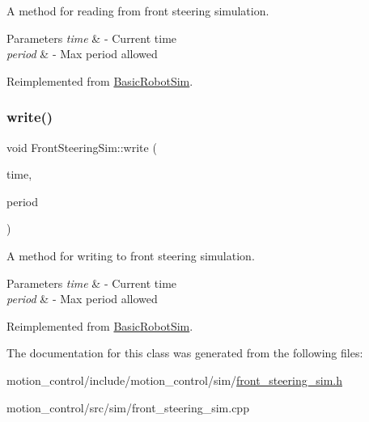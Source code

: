 A method for reading from front steering simulation. 


\begin{DoxyParams}{Parameters}
{\em time} & -\/ Current time \\
\hline
{\em period} & -\/ Max period allowed \\
\hline
\end{DoxyParams}


Reimplemented from \hyperlink{classBasicRobotSim_a8e6a778a8f79818f01dcf0211a3b8e3f}{Basic\+Robot\+Sim}.

\mbox{\label{classFrontSteeringSim_afbf1c3df92319f90d5019729e9067585}} 
\subsubsection{\texorpdfstring{write()}{write()}}
{\footnotesize\ttfamily void Front\+Steering\+Sim\+::write (\begin{DoxyParamCaption}\item[{const ros\+::\+Time \&}]{time,  }\item[{const ros\+::\+Duration \&}]{period }\end{DoxyParamCaption})\hspace{0.3cm}{\ttfamily [virtual]}}



A method for writing to front steering simulation. 


\begin{DoxyParams}{Parameters}
{\em time} & -\/ Current time \\
\hline
{\em period} & -\/ Max period allowed \\
\hline
\end{DoxyParams}


Reimplemented from \hyperlink{classBasicRobotSim_aa05ea705c931dacabb1e47d9ebab3174}{Basic\+Robot\+Sim}.



The documentation for this class was generated from the following files\+:\begin{DoxyCompactItemize}
\item 
motion\+\_\+control/include/motion\+\_\+control/sim/\hyperlink{front__steering__sim_8h}{front\+\_\+steering\+\_\+sim.\+h}\item 
motion\+\_\+control/src/sim/front\+\_\+steering\+\_\+sim.\+cpp\end{DoxyCompactItemize}
